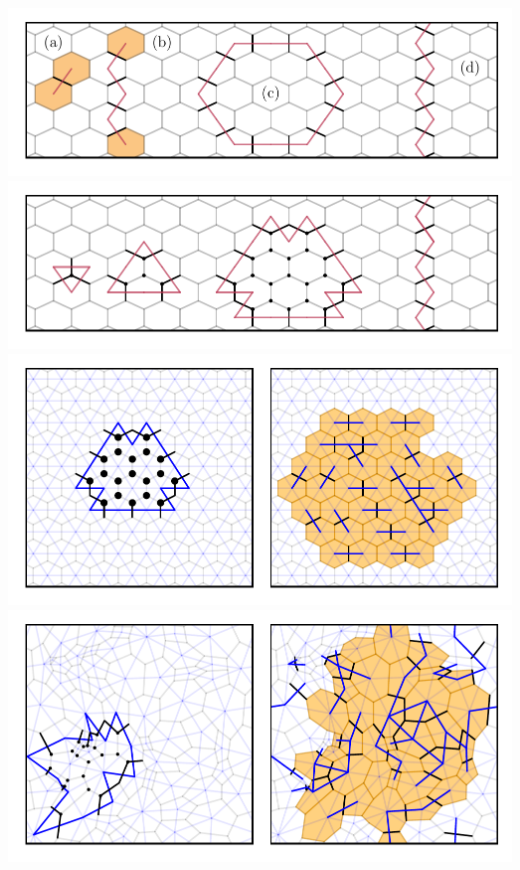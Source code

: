 \includegraphics[width=1\textwidth,height=\textheight]{figure_code/amk_chapter/intro/types_of_dual_loops/types_of_dual_loops.pdf}
\includegraphics[width=1\textwidth,height=\textheight]{figure_code/amk_chapter/intro/gauge_symmetries/gauge_symmetries.pdf}
\includegraphics[width=1\textwidth,height=\textheight]{figure_code/amk_chapter/flood_fill/flood_fill.pdf}
\includegraphics[width=1\textwidth,height=\textheight]{figure_code/amk_chapter/flood_fill_amorphous/flood_fill_amorphous.pdf}

